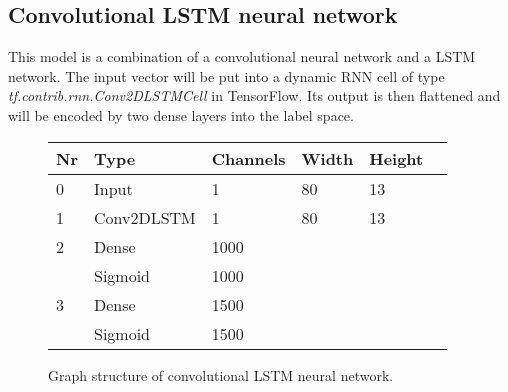 \subsection*{Convolutional LSTM neural network}
This model is a combination of a convolutional neural network and a LSTM network. The input vector will be put into a dynamic RNN cell of type \newline\textit{tf.contrib.rnn.Conv2DLSTMCell} in TensorFlow. Its output is then flattened and will be encoded by two dense layers into the label space.
\begin{figure}[h]
	\centering
	\begin{tabular}{|l|l|l|l|l|l|}
		\hline \textbf{Nr} & \textbf{Type} & \textbf{Channels} & \textbf{Width} & \textbf{Height} \\ \hline
		0 & Input & 1 & 80 & 13 \\ \hline
		1 & Conv2DLSTM & 1 & 80 & 13 \\ \hline
		2 & Dense & 1000 & & \\ \hline
		& Sigmoid & 1000 & & \\ \hline
		3 & Dense & 1500 & & \\ \hline
		& Sigmoid & 1500 & & \\ \hline
	\end{tabular}
	\caption[Convolutional LSTM structure]{Graph structure of convolutional LSTM neural network.}
\end{figure}
\FloatBarrier

\newpage
